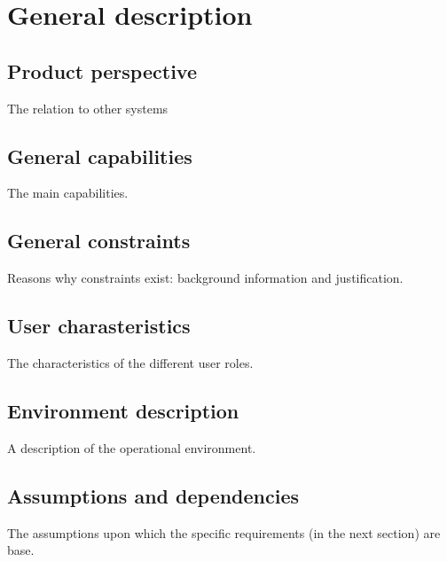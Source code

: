 \chapter{General description}
\section{Product perspective}
The relation to other systems

\section{General capabilities}
The main capabilities.

\section{General constraints}
Reasons why constraints exist: background information and justification.

\section{User charasteristics}
The characteristics of the different user roles.

\section{Environment description}
A description of the operational environment.

\section{Assumptions and dependencies}
The assumptions upon which the specific requirements (in the next section) are base.